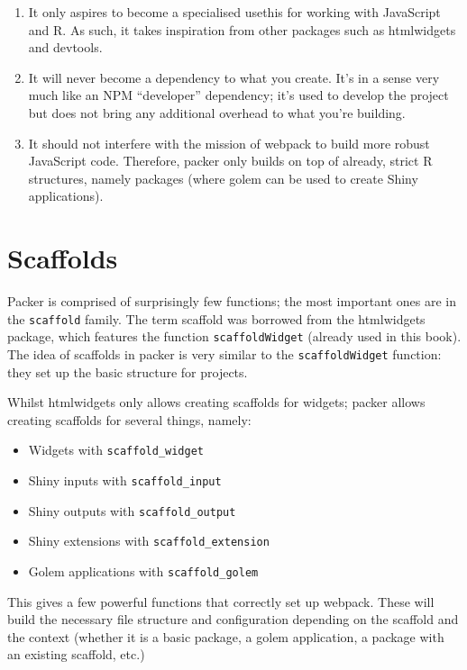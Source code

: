 \documentclass[10pt,]{krantz}
\providecommand{\tightlist}{%
  \setlength{\itemsep}{0pt}\setlength{\parskip}{0pt}}
\begin{document}
\begin{enumerate}
\def\labelenumi{\arabic{enumi}.}
\tightlist
\item
  It only aspires to become a specialised usethis for working with JavaScript and R. As such, it takes inspiration from other packages such as htmlwidgets and devtools.
\item
  It will never become a dependency to what you create. It's in a sense very much like an NPM ``developer'' dependency; it's used to develop the project but does not bring any additional overhead to what you're building.
\item
  It should not interfere with the mission of webpack to build more robust JavaScript code. Therefore, packer only builds on top of already, strict R structures, namely packages (where golem can be used to create Shiny applications).
\end{enumerate}

\hypertarget{packer-scaffolds}{%
\section{Scaffolds}\label{packer-scaffolds}}

Packer is comprised of surprisingly few functions; the most important ones are in the \texttt{scaffold} family. The term scaffold was borrowed from the htmlwidgets package, which features the function \texttt{scaffoldWidget} (already used in this book). The idea of scaffolds in packer is very similar to the \texttt{scaffoldWidget} function: they set up the basic structure for projects.

Whilst htmlwidgets only allows creating scaffolds for widgets; packer allows creating scaffolds for several things, namely:

\begin{itemize}
\tightlist
\item
  Widgets with \texttt{scaffold\_widget}
\item
  Shiny inputs with \texttt{scaffold\_input}
\item
  Shiny outputs with \texttt{scaffold\_output}
\item
  Shiny extensions with \texttt{scaffold\_extension}
\item
  Golem applications with \texttt{scaffold\_golem}
\end{itemize}

This gives a few powerful functions that correctly set up webpack. These will build the necessary file structure and configuration depending on the scaffold and the context (whether it is a basic package, a golem application, a package with an existing scaffold, etc.)
\end{document}

